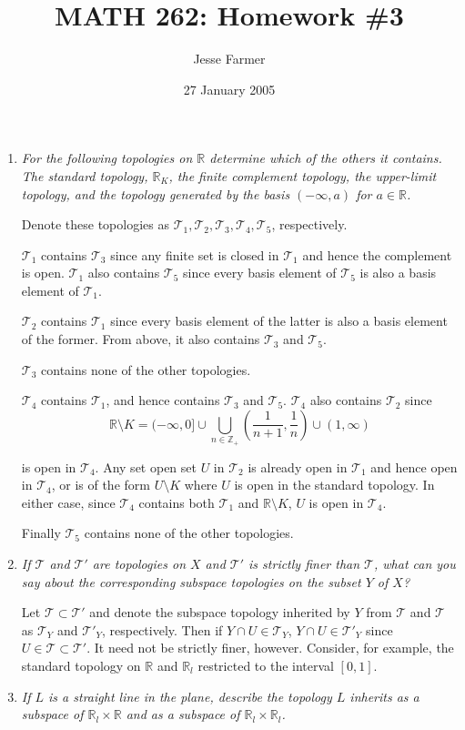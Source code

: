 \documentclass[11pt]{article}
\title{MATH 262: Homework \#3}
\author{Jesse Farmer}
\date{27 January 2005}
\newcommand{\Z}{\mathbb{Z}}
\newcommand{\R}{\mathbb{R}}
\newcommand{\T}{\mathcal{T}}
\begin{document}
\maketitle
\begin{enumerate}

\item \emph{For the following topologies on $\R$ determine which of the others it contains.  The standard topology, $\R_K$, the finite complement topology, the upper-limit topology, and the topology generated by the basis $(-\infty, a)$ for $a \in \R$.}

Denote these topologies as $\T_1, \T_2, \T_3, \T_4, \T_5$, respectively.  

$\T_1$ contains $\T_3$ since any finite set is closed in $\T_1$ and hence the complement is open.  $\T_1$ also contains $\T_5$ since every basis element of $\T_5$ is also a basis element of $\T_1$.

$\T_2$ contains $\T_1$ since every basis element of the latter is also a basis element of the former.  From above, it also contains $\T_3$ and $\T_5$.

$\T_3$ contains none of the other topologies.

$\T_4$ contains $\T_1$, and hence contains $\T_3$ and $\T_5$.  $\T_4$ also contains $\T_2$ since
\[
\R \setminus K = (-\infty, 0] \cup \bigcup_{n \in \Z_+} \left(\frac{1}{n+1}, \frac{1}{n}\right) \cup (1, \infty)
\]

is open in $\T_4$.  Any set open set $U$ in $\T_2$ is already open in $\T_1$ and hence open in $\T_4$, or is of the form $U \setminus K$ where $U$ is open in the standard topology.  In either case, since $\T_4$ contains both $\T_1$ and $\R \setminus K$, $U$ is open in $\T_4$.

Finally $\T_5$ contains none of the other topologies.
\item \emph{If $\T$ and $\T'$ are topologies on $X$ and $\T'$ is strictly finer than $\T$, what can you say about the corresponding subspace topologies on the subset $Y$ of $X$?}

Let $\T \subset \T'$ and denote the subspace topology inherited by $Y$ from $\T$ and $\T$ as $\T_Y$ and $\T'_Y$, respectively.  Then if $Y \cap U \in \T_Y$, $Y \cap U \in \T'_Y$ since $U \in \T \subset \T'$.  It need not be strictly finer, however.  Consider, for example, the standard topology on $\R$ and $\R_l$ restricted to the interval $[0,1]$.

\item \emph{If $L$ is a straight line in the plane, describe the topology $L$ inherits as a subspace of $\R_l \times \R$ and as a subspace of $\R_l \times \R_l$.}


\end{enumerate}
\end{document}
